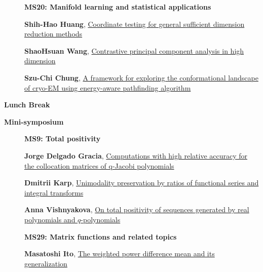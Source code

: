 \documentclass[ILAS2025-program.tex]{subfiles}
\begin{document}
\begin{description}
\begin{description}
{}
        \end{description}
    \begin{description}
    \item[] {\color{mstitle}\textbf{MS20: Manifold learning and statistical applications}} 
    \item[] \hypertarget{up0040}{}\textbf{Shih-Hao Huang}, \hyperlink{down0040}{Coordinate testing for general sufficient dimension reduction methods}
        \item[] \hypertarget{up0041}{}\textbf{ShaoHsuan Wang}, \hyperlink{down0041}{Contrastive principal component analysis in high dimension}
        \item[] \hypertarget{up0042}{}\textbf{Szu-Chi Chung}, \hyperlink{down0042}{A framework for exploring the conformational landscape of cryo-EM using energy-aware pathfinding algorithm}
        \end{description}
    \item[\info{12:30\textrm{--}14:00}] \textbf{Lunch Break} \info{}
    \item[\info{14:00\textrm{--}15:30}] \textbf{Mini-symposium} 
    \begin{description}
    \item[] {\color{mstitle}\textbf{MS9: Total positivity}} 
    \item[] \hypertarget{up0043}{}\textbf{Jorge Delgado Gracia}, \hyperlink{down0043}{Computations with high relative accuracy for the collocation matrices of q-Jacobi polynomials}
        \item[] \hypertarget{up0044}{}\textbf{Dmitrii Karp}, \hyperlink{down0044}{Unimodality preservation by ratios of functional series and integral transforms}
        \item[] \hypertarget{up0045}{}\textbf{Anna Vishnyakova}, \hyperlink{down0045}{On total positivity of sequences generated by 
real polynomials and $q$-polynomials
}
        \end{description}
    \begin{description}
    \item[] {\color{mstitle}\textbf{MS29: Matrix functions and related topics}} 
    \item[] \hypertarget{up0046}{}\textbf{Masatoshi Ito}, \hyperlink{down0046}{The weighted power difference mean and its generalization}

\end{description}
\end{description}
\end{document}
